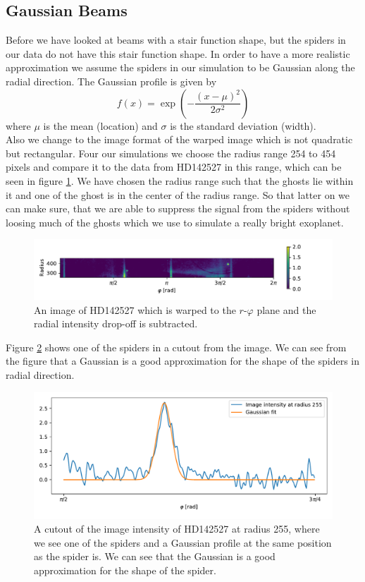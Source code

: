 \subsection{Gaussian Beams}
\label{sec:gaussian}
Before we have looked at beams with a stair function shape, but the spiders in our data do not have this stair function shape. In order to have a more realistic approximation we assume the spiders in our simulation to be Gaussian along the radial direction. The Gaussian profile is given by 
\begin{equation}
	f(x) = \exp \left(-\frac{(x-\mu)^2}{2 \sigma^2} \right)
\end{equation}
where $\mu$ is the mean (location) and $\sigma$ is the standard deviation (width). \\
Also we change to the image format of the warped image which is not quadratic but rectangular. Four our simulations we choose the radius range 254 to 454 pixels and compare it to the data from HD142527 in this range, which can be seen in figure \ref{fig:warped_254_454}. We have chosen the radius range such that the ghosts lie within it and one of the ghost is in the center of the radius range. So that latter on we can make sure, that we are able to suppress the signal from the spiders without loosing much of the ghosts which we use to simulate a really bright exoplanet. 
\begin{figure}[H]
	\centering
		\includegraphics[width=1.1\textwidth]{pics/warped_254_454.pdf}
		\caption{An image of HD142527 which is warped to the $r$-$\varphi$ plane and the radial intensity drop-off is subtracted.}
		\label{fig:warped_254_454}
\end{figure}
Figure \ref{fig:spider_gaussian} shows one of the spiders in a cutout from the image. We can see from the figure that a Gaussian is a good approximation for the shape of the spiders in radial direction.
\begin{figure}[H]
	\centering
		\includegraphics[width=1.0\textwidth]{pics/spyder_gaussian.pdf}
		\caption{A cutout of the image intensity of HD142527 at radius 255, where we see one of the spiders and a Gaussian profile at the same position as the spider is. We can see that the Gaussian is a good approximation for the shape of the spider.}
		\label{fig:spider_gaussian}
\end{figure}
